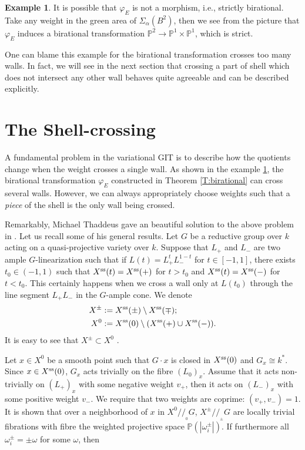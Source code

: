 \documentclass{amsart}
\theoremstyle{definition}
\newtheorem{example}[theorem]{Example}
\theoremstyle{remark}
\numberwithin{equation}{section}
\begin{document}
\begin{example} \label{Ex:SB}
It is possible that $\varphi_E$ is not a morphism, i.e., strictly birational. Take any weight in the green area of $\Sigma_\alpha(B^2)$, then we see from the picture that $\varphi_E$ induces a birational transformation ${\mathbb{{P}}}^2 \to {\mathbb{{P}}}^1\times{\mathbb{{P}}}^1$, which is strict.
\end{example}

One can blame this example for the birational transformation crosses too many walls. In fact, we will see in the next section that crossing a part of shell which does not intersect any other wall behaves quite agreeable and can be described explicitly.

\section{The Shell-crossing} \label{S:SC}

A fundamental problem in the variational GIT is to describe how the quotients change when the weight crosses a single wall. As shown in the example \ref{Ex:SB}, the birational transformation $\varphi_E$ constructed in Theorem \ref{T:birational} can cross several walls. However, we can always appropriately choose weights such that a {\em piece} of the shell is the only wall being crossed.

Remarkably, Michael Thaddeus gave an beautiful solution to the above problem in \cite{T}. Let us recall some of his general results. Let $G$ be a reductive group over $k$ acting on a quasi-projective variety over $k$. Suppose that $L_+$ and $L_-$ are two ample $G$-linearization such that if $L(t)=L_+^t L_-^{1-t}$ for $t\in[-1,1]$, there exists $t_0\in(-1,1)$ such that $X^{\rm ss}(t)=X^{\rm ss}(+)$ for $t>t_0$ and $X^{\rm ss}(t)=X^{\rm ss}(-)$ for $t<t_0$. This certainly happens when we cross a wall only at $L(t_0)$ through the line segment $L_+L_-$ in the $G$-ample cone.
We denote
\begin{align*}
  X^{\pm} &:= X^{\rm ss}(\pm)\setminus X^{\rm ss}(\mp);\\
  X^0 &:= X^{\rm ss}(0)\setminus (X^{\rm ss}(+)\cup X^{\rm ss}(-)).
\end{align*}
It is easy to see that $X^{\pm}\subset X^0$ \cite[Lemma 4.1]{T}.

Let $x\in X^0$ be a smooth point such that $G\cdot x$ is closed in $X^{\rm ss}(0)$ and $G_x\cong k^*$. Since $x\in X^{\rm ss}(0)$, $G_x$ acts trivially on the fibre $(L_0)_x$. Assume that it acts non-trivially on $(L_+)_x$ with some negative weight $v_+$, then it acts on $(L_-)_x$ with some positive weight $v_-$. We require that two weights are coprime: $(v_+,v_-)=1$. It is shown that over a neighborhood of $x$ in $X^0{/\!\!/_{\!\!_{0}}}G$, $X^{\pm}{/\!\!/_{\!\!_{\pm}}}G$ are locally trivial fibrations with fibre the weighted projective space ${\mathbb{{P}}}(|\omega_i^{\pm}|)$. If furthermore all $\omega_i^{\pm}=\pm\omega$ for some $\omega$, then
\end{document}
